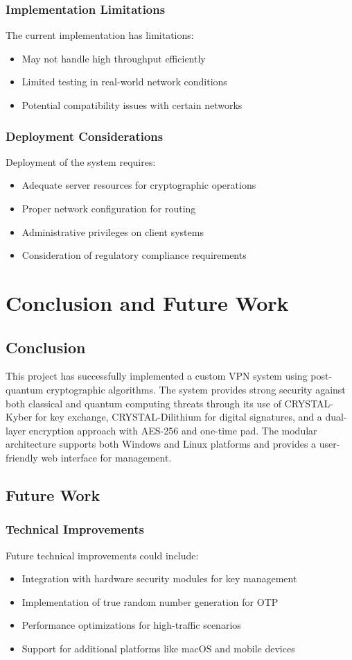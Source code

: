 \documentclass[12pt,a4paper]{report}
\begin{document}
\subsection{Implementation Limitations}
The current implementation has limitations:
\begin{itemize}
    \item May not handle high throughput efficiently
    \item Limited testing in real-world network conditions
    \item Potential compatibility issues with certain networks
\end{itemize}

\subsection{Deployment Considerations}
Deployment of the system requires:
\begin{itemize}
    \item Adequate server resources for cryptographic operations
    \item Proper network configuration for routing
    \item Administrative privileges on client systems
    \item Consideration of regulatory compliance requirements
\end{itemize}

\chapter{Conclusion and Future Work}
\section{Conclusion}
This project has successfully implemented a custom VPN system using post-quantum cryptographic algorithms. The system provides strong security against both classical and quantum computing threats through its use of CRYSTAL-Kyber for key exchange, CRYSTAL-Dilithium for digital signatures, and a dual-layer encryption approach with AES-256 and one-time pad. The modular architecture supports both Windows and Linux platforms and provides a user-friendly web interface for management.

\section{Future Work}
\subsection{Technical Improvements}
Future technical improvements could include:
\begin{itemize}
    \item Integration with hardware security modules for key management
    \item Implementation of true random number generation for OTP
    \item Performance optimizations for high-traffic scenarios
    \item Support for additional platforms like macOS and mobile devices
\end{itemize}
\end{document}
